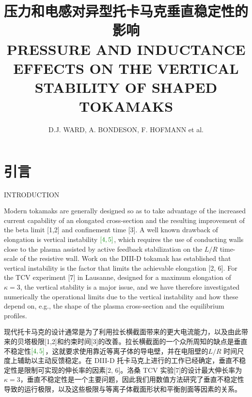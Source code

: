 \documentclass[utf8]{ctexart}
\title{压力和电感对异型托卡马克垂直稳定性的影响\\ \Large{PRESSURE AND INDUCTANCE EFFECTS ON THE VERTICAL STABILITY OF SHAPED TOKAMAKS }}  \author{D.J. WARD,  A. BONDESON,  F. HOFMANN et al.}
\date{\paperref}
\newcommand\mainskip{-5pt}
\newcommand\enzhbox[2]{
  	\quad\par \begin{paracol}{2} \colseprulecolor{black} 
  		\begin{spacing}{1.0}
  			\footnotesize  #1
  		\end{spacing}
  		\switchcolumn[1] 
  		#2
  	\end{paracol} \quad\par
  }
\begin{document}
  \begin{sloppypar}
  \allowdisplaybreaks[3]  
  \setlength{\abovedisplayskip}{-6pt}
  \setlength{\belowdisplayskip}{10pt}
  \setlength{\abovedisplayshortskip}{0pt}
  \setlength{\belowdisplayshortskip}{0pt}
  \setlength{\parskip}{\mainskip}
  
  	\maketitle
  
  
  
 \section{引言}
 {  \small INTRODUCTION \par }
 
\enzhbox{  Modern tokamaks are generally designed so as to take advantage of the increased current capability of an elongated cross-section and the resulting improvement of the beta limit \textcolor{green!50!black}{[1,2]} and confinement time \textcolor{green!50!black}{[3]}. A well known drawback of elongation is vertical instability $\textcolor{green!50!black}{[4,5]}$, which requires the use of conducting walls close to the plasma assisted by active feedback stabilization on the $L / R$ time-scale of the resistive wall. Work on the DIII-D tokamak has established that vertical instability is the factor that limits the achievable elongation \textcolor{green!50!black}{[2, 6]}. For the TCV experiment \textcolor{green!50!black}{[7]} in Lausanne, designed for a maximum elongation of $\kappa=3$, the vertical stability is a major issue, and we have therefore investigated numerically the operational limits due to the vertical instability and how these depend on, e.g., the shape of the plasma cross-section and the equilibrium profiles.}{
现代托卡马克的设计通常是为了利用拉长横截面带来的更大电流能力，以及由此带来的贝塔极限\textcolor{green!50!black}{[1,2]}和约束时间\textcolor{green!50!black}{[3]}的改善。拉长横截面的一个众所周知的缺点是垂直不稳定性$\textcolor{green!50!black}{[4,5]}$，这就要求使用靠近等离子体的导电壁，并在电阻壁的$L / R$ 时间尺度上辅助以主动反馈稳定。在 DIII-D 托卡马克上进行的工作已经确定，垂直不稳定性是限制可实现的伸长率的因素\textcolor{green!50!black}{[2, 6]}。洛桑 TCV 实验\textcolor{green!50!black}{[7]}的设计最大伸长率为 $\kappa=3$，垂直不稳定性是一个主要问题，因此我们用数值方法研究了垂直不稳定性导致的运行极限，以及这些极限与等离子体截面形状和平衡剖面等因素的关系。}
  

\end{sloppypar}
\end{document}
